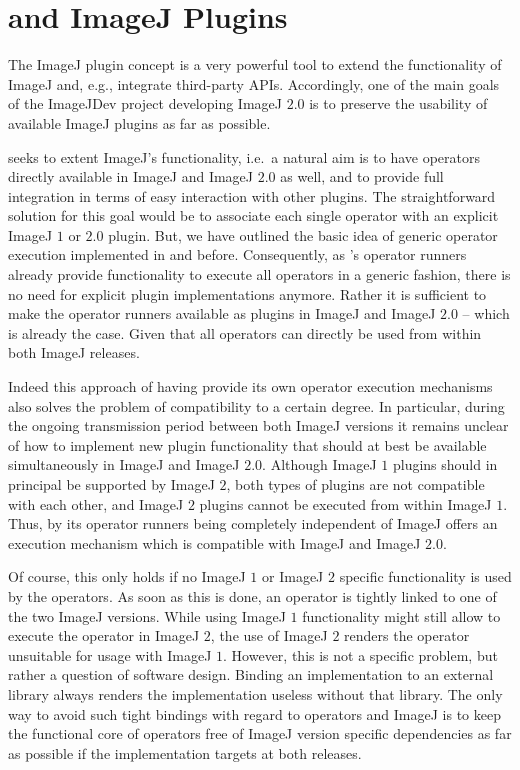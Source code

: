 \section{\mitobo and ImageJ Plugins}
\label{chap:ImplPlugins}
The ImageJ plugin concept is a very powerful tool to extend the functionality of ImageJ
and, e.g., integrate third-party APIs. Accordingly, one of the main goals of the ImageJDev 
project developing ImageJ $2.0$ is to preserve the usability of available ImageJ plugins as far 
as possible. 

\mitobo seeks to extent ImageJ's functionality, 
i.e.~a natural aim is to have \mitobo operators directly available in ImageJ and ImageJ $2.0$ as
well, and to provide full integration in terms of easy interaction with other plugins. 
The straightforward solution for this goal would be to associate each single \mitobo operator with 
an explicit ImageJ $1$ or $2.0$ plugin. But, we have outlined the basic idea of generic operator 
execution implemented in \alida and \mitobo before. Consequently, as \mitobo's operator runners 
already provide functionality to execute all operators in a generic fashion, there is no need for 
explicit plugin implementations anymore. Rather it is sufficient to make the operator runners 
available as plugins in ImageJ and ImageJ $2.0$ -- which is already the case. 
Given that all operators can 
directly be used from within both ImageJ releases.

Indeed this approach of having \mitobo provide its own operator execution mechanisms also solves the
problem of compatibility to a certain degree. In particular, during the ongoing transmission period 
between both ImageJ versions it remains unclear of how to implement new plugin functionality that 
should at best be available simultaneously in ImageJ and ImageJ $2.0$. Although 
ImageJ $1$ plugins should in principal be supported by ImageJ $2$, both types of plugins are
not compatible with each other, and ImageJ $2$ plugins cannot be executed from within ImageJ $1$. 
Thus, by its operator runners being completely independent of ImageJ \mitobo offers an execution 
mechanism which is compatible with ImageJ and ImageJ $2.0$. 

Of course, this only holds if no ImageJ $1$ or ImageJ $2$ specific functionality is used by
the operators. As soon as this is done, an operator is tightly linked to one of the two ImageJ 
versions. While using ImageJ $1$ functionality might still allow to execute the operator in 
ImageJ $2$, the use of ImageJ $2$ renders the operator unsuitable for usage with ImageJ $1$.
However, this is not a \mitobo specific problem, but rather a question of software design.
Binding an implementation to an external library always renders the implementation useless without
that library. The only way to avoid such tight bindings with regard to operators and ImageJ is to
keep the functional core of operators free of ImageJ version specific dependencies as far as 
possible if the implementation targets at both releases.
 
